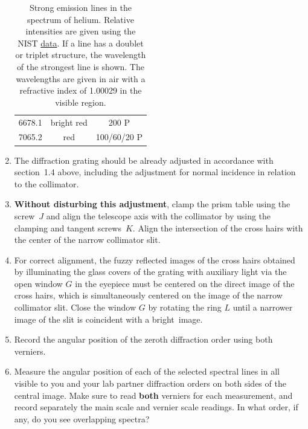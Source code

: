 \documentclass[12pt]{article}
\begin{document}
\begin{enumerate}
\begin{table}[ht!]
\begin{tabular}{|c|c|c|}
    6678.1 & bright red & 200 P\\
    7065.2 & red & 100/60/20 P\\
    \hline       
    \end{tabular}
        \caption{Strong emission lines in the spectrum of helium. Relative intensities are given using the NIST \href{https://physics.nist.gov/PhysRefData/Handbook/Tables/heliumtable2.htm}{data}. If a line has a doublet or triplet structure, the wavelength of the strongest line is shown. The wavelengths are given in air with a refractive index of 1.00029 in the visible region.}\label{strong_helium_lines}
    \end{table}  
    \item The diffraction grating should be already adjusted in accordance with section~1.4 above, including the adjustment for normal incidence in relation to the collimator.
    \item \textbf{Without disturbing this adjustment}, clamp the prism table using the screw~$J$ and align the telescope axis with the collimator by using the clamping and tangent screws~$K$. Align the intersection of the cross hairs with the center of the narrow collimator slit.
    \item For correct alignment, the fuzzy reflected images of the cross hairs obtained by illuminating the glass covers of the grating with auxiliary light via the open window $G$ in the eyepiece must be centered on the direct image of the cross hairs, which is simultaneously centered on the image of the narrow collimator slit. Close the window $G$ by rotating the ring $L$ until a narrower image of the slit is coincident with a bright~image.
    \item Record the angular position of the zeroth diffraction order using both verniers.
    \item Measure the angular position of each of the selected spectral lines in all visible to you and your lab partner diffraction orders on both sides of the central image. Make sure to read \textbf{both} verniers for each measurement, and record separately the main scale and vernier scale readings. In what order, if any, do you see overlapping spectra?

\end{enumerate}
\end{document}
